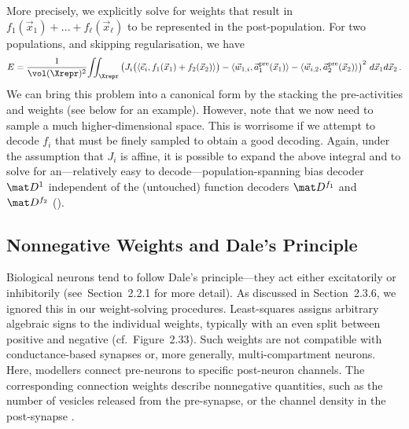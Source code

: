 More precisely, we explicitly solve for weights that result in $f_1(\vec x_1) + \ldots + f_\ell(\vec x_\ell)$ to be represented in the post-population.
For two populations, and skipping regularisation, we have
\begin{align}
	E =
	\frac{1}{\vol(\Xrepr)^2} \! \iint_{\Xrepr}
	\left(
		J_i\bigl(\langle \vec e_i, f_1(\vec x_1) + f_2(\vec x_2) \rangle\bigr)
		- \langle \vec w_{1, i}, \vec a_1^\mathrm{pre}(\vec x_1) \rangle
		- \langle \vec w_{i, 2}, \vec a_2^\mathrm{pre}(\vec x_2) \rangle
	\right)^2 \, d\vec x_1 d\vec x_2 \,.
	\label{eqn:decode_current_additive}
\end{align}
We can bring this problem into a canonical form by the stacking the pre-activities and weights (see below for an example).
However, note that we now need to sample a much higher-dimensional space.
This is worrisome if we attempt to decode $f_i$ that must be finely sampled to obtain a good decoding.
Again, under the assumption that $J_i$ is affine, it is possible to expand the above integral and to solve for an---relatively easy to decode---population-spanning bias decoder $\mat D^1$ independent of the (untouched) function decoders $\mat D^{f_1}$ and $\mat D^{f_2}$ ().


\subsection{Nonnegative Weights and Dale's Principle}
\label{sec:nef_nonneg}

Biological neurons tend to follow Dale's principle---they act either excitatorily or inhibitorily (see~Section~2.2.1 for more detail).
As discussed in Section~2.3.6, we ignored this in our weight-solving procedures.
Least-squares assigns arbitrary algebraic signs to the individual weights, typically with an even split between positive and negative (cf.~Figure~2.33).
Such weights are not compatible with conductance-based synapses or, more generally, multi-compartment neurons.
Here, modellers connect pre-neurons to specific post-neuron channels.
The corresponding connection weights describe nonnegative quantities, such as the number of vesicles released from the pre-synapse, or the channel density in the post-synapse \citep{roth2009modeling}.

